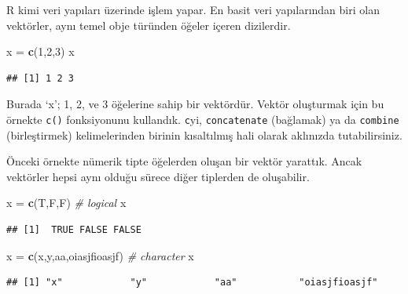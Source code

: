 \documentclass[
]{book}
\newenvironment{Shaded}{\begin{snugshade}}{\end{snugshade}}
\newcommand{\CommentTok}[1]{\textcolor[rgb]{0.56,0.35,0.01}{\textit{#1}}}
\newcommand{\DecValTok}[1]{\textcolor[rgb]{0.00,0.00,0.81}{#1}}
\newcommand{\KeywordTok}[1]{\textcolor[rgb]{0.13,0.29,0.53}{\textbf{#1}}}
\newcommand{\NormalTok}[1]{#1}
\newcommand{\StringTok}[1]{\textcolor[rgb]{0.31,0.60,0.02}{#1}}
\begin{document}
R kimi veri yapıları üzerinde işlem yapar. En basit veri yapılarından biri olan vektörler, aynı temel obje türünden öğeler içeren dizilerdir.

\begin{Shaded}
\begin{Highlighting}[]
\NormalTok{x =}\StringTok{ }\KeywordTok{c}\NormalTok{(}\DecValTok{1}\NormalTok{,}\DecValTok{2}\NormalTok{,}\DecValTok{3}\NormalTok{)}
\NormalTok{x}
\end{Highlighting}
\end{Shaded}

\begin{verbatim}
## [1] 1 2 3
\end{verbatim}

Burada `x'; 1, 2, ve 3 öğelerine sahip bir vektördür. Vektör oluşturmak için bu örnekte \texttt{c()} fonksiyonunu kullandık. \texttt{c}yi, \texttt{concatenate} (bağlamak) ya da \texttt{combine} (birleştirmek) kelimelerinden birinin kısaltılmış hali olarak aklınızda tutabilirsiniz.

Önceki örnekte nümerik tipte öğelerden oluşan bir vektör yarattık. Ancak vektörler hepsi aynı olduğu sürece diğer tiplerden de oluşabilir.

\begin{Shaded}
\begin{Highlighting}[]
\NormalTok{x =}\StringTok{ }\KeywordTok{c}\NormalTok{(T,F,F) }\CommentTok{\# logical}
\NormalTok{x}
\end{Highlighting}
\end{Shaded}

\begin{verbatim}
## [1]  TRUE FALSE FALSE
\end{verbatim}

\begin{Shaded}
\begin{Highlighting}[]
\NormalTok{x =}\StringTok{ }\KeywordTok{c}\NormalTok{(}\StringTok{\textquotesingle{}x\textquotesingle{}}\NormalTok{,}\StringTok{\textquotesingle{}y\textquotesingle{}}\NormalTok{,}\StringTok{\textquotesingle{}aa\textquotesingle{}}\NormalTok{,}\StringTok{\textquotesingle{}oiasjfioasjf\textquotesingle{}}\NormalTok{) }\CommentTok{\# character}
\NormalTok{x}
\end{Highlighting}
\end{Shaded}

\begin{verbatim}
## [1] "x"            "y"            "aa"           "oiasjfioasjf"
\end{verbatim}
\end{document}
